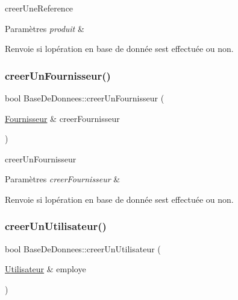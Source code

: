 creer\+Une\+Reference 


\begin{DoxyParams}{Paramètres}
{\em produit} & \\
\hline
\end{DoxyParams}
\begin{DoxyReturn}{Renvoie}
si l\textquotesingle{}opération en base de donnée s\textquotesingle{}est effectuée ou non. 
\end{DoxyReturn}
\mbox{\label{class_base_de_donnees_a81715fc3632e6533d9c66a66c62e897b}} 
\subsubsection{\texorpdfstring{creer\+Un\+Fournisseur()}{creerUnFournisseur()}}
{\footnotesize\ttfamily bool Base\+De\+Donnees\+::creer\+Un\+Fournisseur (\begin{DoxyParamCaption}\item[{\mbox{\hyperlink{class_fournisseur}{Fournisseur}} \&}]{creer\+Fournisseur }\end{DoxyParamCaption})}



creer\+Un\+Fournisseur 


\begin{DoxyParams}{Paramètres}
{\em creer\+Fournisseur} & \\
\hline
\end{DoxyParams}
\begin{DoxyReturn}{Renvoie}
si l\textquotesingle{}opération en base de donnée s\textquotesingle{}est effectuée ou non. 
\end{DoxyReturn}
\mbox{\label{class_base_de_donnees_acc7f10ab9b4699eaa495fa7829c0cfbd}} 
\subsubsection{\texorpdfstring{creer\+Un\+Utilisateur()}{creerUnUtilisateur()}}
{\footnotesize\ttfamily bool Base\+De\+Donnees\+::creer\+Un\+Utilisateur (\begin{DoxyParamCaption}\item[{\mbox{\hyperlink{class_utilisateur}{Utilisateur}} \&}]{employe }\end{DoxyParamCaption})}



